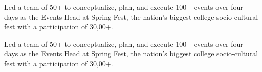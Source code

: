 \documentclass[a4paper,12pt]{memoir} %
\begin{document}

{\bluebullet Led a team of 50+ to conceptualize, plan, and execute 100+ events over four days as the Events
Head at Spring Fest, the nation's biggest college socio-cultural fest with a participation of 30,00+.}

{\bluebullet Led a team of 50+ to conceptualize, plan, and execute 100+ events over four days as the Events
Head at Spring Fest, the nation's biggest college socio-cultural fest with a participation of 30,00+.}

\Sep
\end{document}
